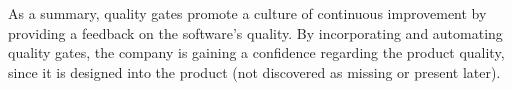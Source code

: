 \noindent As a summary, quality gates promote a culture of continuous improvement by providing a feedback on the 
software's quality. By incorporating and automating quality gates, the company is gaining a confidence regarding the
product quality, since it is designed into the product (not discovered as missing or present later).
